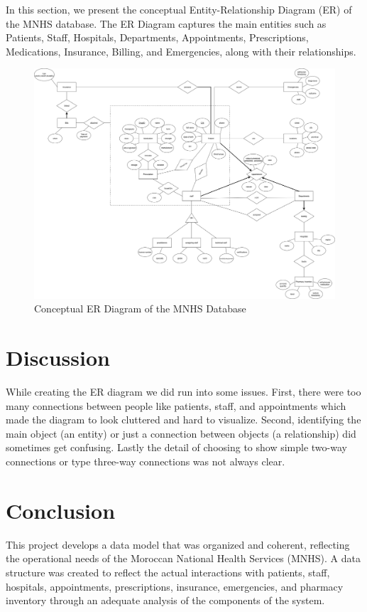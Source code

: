 \documentclass[a4paper,12pt]{article}
\begin{document}
In this section, we present the conceptual Entity-Relationship Diagram (ER) of the MNHS database. The ER Diagram captures the main entities such as Patients, Staff, Hospitals, Departments, Appointments, Prescriptions, Medications, Insurance, Billing, and Emergencies, along with their relationships.

\begin{figure}[H]
    \centering
    \includegraphics[width=\textwidth]{Figures/ERDFinal.png}
    \caption{Conceptual ER Diagram of the MNHS Database}
    \label{fig:erd}
\end{figure}

\section{Discussion}
While creating the ER diagram we did run into some issues. First, there were too many connections between people like patients, staff, and appointments which made the diagram to look cluttered and hard to visualize. Second, identifying the main object (an entity) or just a connection between objects (a relationship) did sometimes get confusing. Lastly the detail of choosing to show simple two-way connections or type three-way connections was not always clear.

\section{Conclusion}
This project develops a data model that was organized and coherent, reflecting the operational needs of the Moroccan National Health Services (MNHS). A data structure was created to reflect the actual interactions with patients, staff, hospitals, appointments, prescriptions, insurance, emergencies, and pharmacy inventory through an adequate analysis of the components of the system. 
\end{document}

